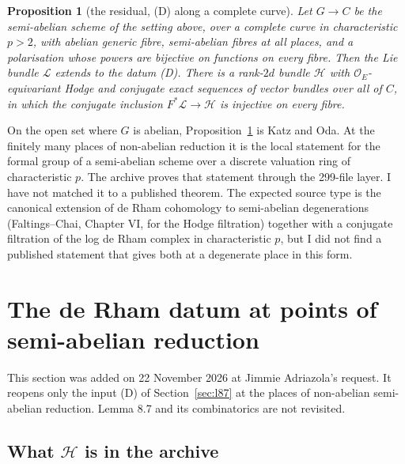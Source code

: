\documentclass[11pt]{article}
\newtheorem{proposition}[theorem]{Proposition}
\theoremstyle{remark}
\begin{document}
\begin{proposition}[the residual, (D) along a complete curve]\label{prop:D}
Let $G\to C$ be the semi-abelian scheme of the setting above, over a complete curve in characteristic $p>2$, with abelian generic fibre, semi-abelian fibres at all places, and a polarisation whose powers are bijective on functions on every fibre. Then the Lie bundle $\mathcal L$ extends to the datum (D). There is a rank-$2d$ bundle $\mathcal H$ with $\mathcal O_E$-equivariant Hodge and conjugate exact sequences of vector bundles over all of $C$, in which the conjugate inclusion $F^*\mathcal L\to\mathcal H$ is injective on every fibre.
\end{proposition}

On the open set where $G$ is abelian, Proposition~\ref{prop:D} is Katz and Oda. At the finitely many places of non-abelian reduction it is the local statement for the formal group of a semi-abelian scheme over a discrete valuation ring of characteristic $p$. The archive proves that statement through the 299-file  layer. I have not matched it to a published theorem. The expected source type is the canonical extension of de Rham cohomology to semi-abelian degenerations (Faltings--Chai, Chapter VI, for the Hodge filtration) together with a conjugate filtration of the log de Rham complex in characteristic $p$, but I did not find a published statement that gives both at a degenerate place in this form.

\section{The de Rham datum at points of semi-abelian reduction}\label{sec:sab}

This section was added on 22 November 2026 at Jimmie Adriazola's request. It reopens only the input (D) of Section~\ref{sec:l87} at the places of non-abelian semi-abelian reduction. Lemma 8.7 and its combinatorics are not revisited.

\subsection{What \texorpdfstring{$\mathcal H$}{H} is in the archive}
\end{document}
